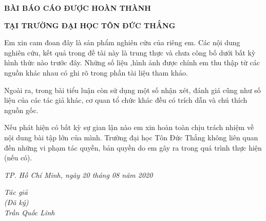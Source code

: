 \newpage
\changefontsizes{16pt}
\centerline{\textbf{BÀI BÁO CÁO ĐƯỢC HOÀN THÀNH}}
\centerline{\textbf{TẠI TRƯỜNG ĐẠI HỌC TÔN ĐỨC THẮNG}}
\changefontsizes{13pt}
\vspace{1cm}
\setlength{\parindent}{2cm}
Em xin cam đoan đây là sản phẩm nghiên cứu của riêng em. Các nội dung nghiên cứu, kết quả trong đề tài này là trung thực và chưa công bố dưới bất kỳ hình thức nào trước đây. Những số liệu ,hình ảnh được chính em thu thập từ các nguồn khác nhau có ghi rõ trong phần tài liệu tham khảo.

\setlength{\parindent}{2cm}
Ngoài ra, trong bài tiểu luận còn sử dụng một số nhận xét, đánh giá cũng như số liệu của các tác giả khác, cơ quan tổ chức khác đều có trích dẫn và chú thích nguồn gốc.

\setlength{\parindent}{2cm}
Nếu phát hiện có bất kỳ sự gian lận nào em xin hoàn toàn chịu trách nhiệm về nội dung bài tập lớn của mình. Trường đại học Tôn Đức Thắng không liên quan đến những vi phạm tác quyền, bản quyền do em gây ra trong quá trình thực hiện (nếu có).

\vspace{0.75cm}
\begin{flushright}
	\renewcommand{\baselinestretch}{0.05}
	\changefontsizes{13pt}
	\textit{TP. Hồ Chí Minh, ngày 20 tháng 08 năm 2020}
\end{flushright}

\setlength{\parindent}{12.5cm}
\textit{Tác giả}\\

\setlength{\parindent}{12.5cm}
\textit{(Đã ký)}\\

\setlength{\parindent}{11.75cm}
\textit{Trần Quốc Lĩnh}\\